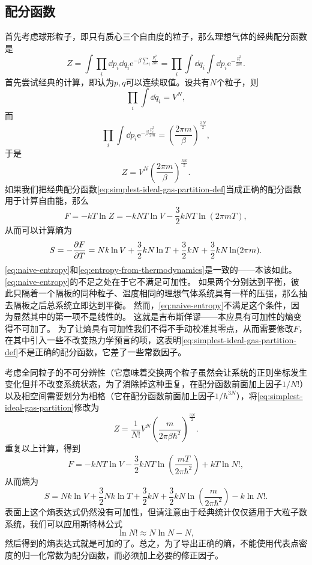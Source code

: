 \documentclass[hyperref, UTF8, a4paper]{ctexart}
\newcommand*{\ee}{\mathrm{e}}
\begin{document}
\subsection{配分函数}

首先考虑球形粒子，即只有质心三个自由度的粒子，那么理想气体的经典配分函数是
\begin{equation}
    Z = \int \prod_i \dd{p_i} \dd{q_i} \ee^{- \beta \sum_i \frac{p_i^2}{2m}} = \prod_i \int \dd{q_i} \int \dd{p_i} \ee^{- \frac{p_i^2}{2m} }.
    \label{eq:simplest-ideal-gas-partition-def}
\end{equation}
首先尝试经典的计算，即认为$p,q$可以连续取值。设共有$N$个粒子，则
\[
    \prod_i \int \dd{q_i} = V^{N},
\]
而
\[
    \prod_i \int \dd{p_i} \ee^{- \beta \frac{p_i^2}{2m}} = \left( \frac{2\pi m}{\beta} \right)^{\frac{3N}{2}},
\]
于是
\begin{equation}
    Z = V^{N} \left( \frac{2\pi m}{\beta} \right)^{\frac{3N}{2}}.
    \label{eq:simplest-ideal-gas-partition}
\end{equation}
如果我们把经典配分函数\eqref{eq:simplest-ideal-gas-partition-def}当成正确的配分函数用于计算自由能，那么
\[
    F = - k T \ln Z = - kNT \ln V - \frac{3}{2} kNT \ln (2\pi m T),
\]
从而可以计算熵为
\begin{equation}
    S = - \pdv{F}{T} = Nk \ln V + \frac{3}{2} kN \ln T + \frac{3}{2} kN + \frac{3}{2} kN \ln (2\pi m).
    \label{eq:naive-entropy}
\end{equation}
\eqref{eq:naive-entropy}和\eqref{eq:entropy-from-thermodynamics}是一致的——本该如此。\eqref{eq:naive-entropy}的不足之处在于它不满足可加性。
如果两个分别达到平衡，彼此只隔着一个隔板的同种粒子、温度相同的理想气体系统具有一样的压强，那么抽去隔板之后总系统立即达到平衡。
然而，\eqref{eq:naive-entropy}不满足这个条件，因为显然其中的第一项不是线性的。
这就是吉布斯佯谬——本应具有可加性的熵变得不可加了。
为了让熵具有可加性我们不得不手动校准其零点，从而需要修改$F$，在其中引入一些不改变热力学预言的项，这表明\eqref{eq:simplest-ideal-gas-partition-def}不是正确的配分函数，它差了一些常数因子。

考虑全同粒子的不可分辨性（它意味着交换两个粒子虽然会让系统的正则坐标发生变化但并不改变系统状态，为了消除掉这种重复，在配分函数前面加上因子$1/N!$）以及相空间需要划分为相格（它在配分函数前面加上因子$1/h^{3N}$），将\eqref{eq:simplest-ideal-gas-partition}修改为
\begin{equation}
    Z = \frac{1}{N!} V^{N} \left( \frac{m}{2\pi \beta \hbar^2} \right)^{\frac{3N}{2}}.
\end{equation}
重复以上计算，得到
\[
    F = - kNT \ln V - \frac{3}{2} kNT \ln \left(\frac{m T}{2\pi \hbar^2}\right) + k T \ln N!,
\]
从而熵为
\[
    S = N k \ln V + \frac{3}{2} Nk \ln T + \frac{3}{2} kN + \frac{3}{2} kN \ln \left( \frac{m}{2\pi \hbar^2} \right) - k \ln N!.
\]
表面上这个熵表达式仍然没有可加性，但请注意由于经典统计仅仅适用于大粒子数系统，我们可以应用斯特林公式
\[
    \ln N! \approx N \ln N - N,
\]
然后得到的熵表达式就是可加的了。总之，为了导出正确的熵，不能使用代表点密度的归一化常数为配分函数，而必须加上必要的修正因子。
\end{document}
